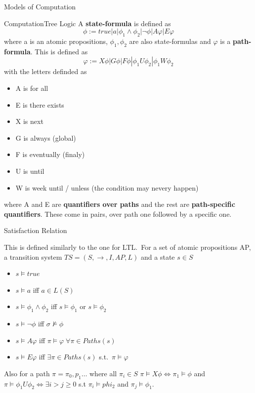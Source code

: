 \documentclass[12pt, letterpaper]{article}
\begin{document}
\begin{section}{Models of Computation}
\begin{subsection}{ComputationTree Logic}
    A \textbf{state-formula} is defined as
    \[\phi := true | a | \phi_{1} \land \phi_{2} | \lnot \phi | A \varphi | E \varphi\]
    where a is an atomic propositions, \(\phi_{1}, \phi_{2}\) are also
    state-formulas and \(\varphi\) is a \textbf{path-formula}. This is defined as
    \[\varphi := X \phi | G \phi | F \phi | \phi_{1} U \phi_{2} | \phi_{1} W \phi_{2}\]
    with the letters definded as
    \begin{itemize}
      \item A is for all
      \item E is there exists
      \item X is next
      \item G is always (global)
      \item F is eventually (finaly)
      \item U is until
      \item W is week until / unless (the condition may nevery happen)
    \end{itemize}
    where A and E are \textbf{quantifiers over paths} and the rest are
    \textbf{path-specific quantifiers}. These come in pairs, over path one followed
    by a specific one.

    \begin{subsubsection}{Satisfaction Relation}

      This is defined similarly to the one for LTL.\ For a set of atomic propositions
      AP, a transition system \(TS = (S, \to, I, AP, L)\) and a state \(s \in S\)
      \begin{itemize}
        \item \(s \models true\)
        \item \(s \models a\) iff \(a \in L(S)\)
        \item \(s \models \phi_{1} \land \phi_{2}\) iff
        \(s \models \phi_{1}\) or \(s \models \phi_{2}\)
        \item \(s \models \lnot \phi\) iff \(\sigma \not\models \phi\)
        \item \(s \models A \varphi\) iff \(\pi \models \varphi \;
              \forall \pi \in Paths(s)\)
        \item \(s \models E \varphi\) iff \(\exists \pi \in Paths(s)\)
              s.t.\ \(\pi \models \varphi\)
      \end{itemize}

      Also for a path \(\pi = \pi_{0}, p_{1} \dots\) where all \(\pi_{i} \in S\)
      \(\pi \models X \phi \iff \pi_{1} \models \phi\) and \\
      \(\pi \models \phi_{1} U \phi_{2} \iff \exists i > j \geq 0\) s.t
      \(\pi_{i} \models phi_{2}\) and \(\pi_{j} \models \phi_{1}\).


\end{subsubsection}
\end{subsection}
\end{section}
\end{document}

